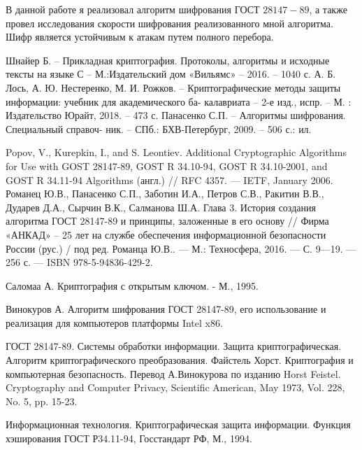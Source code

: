 \documentclass[oneside,final,14pt]{extreport}
\begin{document}
В данной работе я реализовал алгоритм шифрования ГОСТ $28147-89$, а также провел исследования скорости шифрования реализованного мной алгоритма. Шифр является устойчивым к атакам путем полного перебора.\\



\begin{thebibliography}{10}

Шнайер Б. – Прикладная криптография. Протоколы, алгоритмы
и исходные тексты на языке С – М.:Издательский дом «Вильямс» –
2016. – 1040 с.
А. Б. Лось, А. Ю. Нестеренко, М. И. Рожков. – Криптографические
методы защиты информации: учебник для академического ба-
калавриата – 2-е изд., испр. – М. : Издательство Юрайт, 2018. – 473
с.
Панасенко С.П. – Алгоритмы шифрования. Специальный справоч-
ник. – СПб.: БХВ-Петербург, 2009. – 506 с.: ил.


Popov, V., Kurepkin, I., and S. Leontiev. Additional Cryptographic Algorithms for Use with GOST 28147-89, GOST R 34.10-94, GOST R 34.10-2001, and GOST R 34.11-94 Algorithms (англ.) // RFC 4357. — IETF, January 2006.
Романец Ю.В., Панасенко С.П., Заботин И.А., Петров С.В., Ракитин В.В., Дударев Д.А., Сырчин В.К., Салманова Ш.А. Глава 3. История создания алгоритма ГОСТ 28147-89 и принципы, заложенные в его основу // Фирма «АНКАД» – 25 лет на службе обеспечения информационной безопасности России (рус.) / под ред. Романца Ю.В.. — М.: Техносфера, 2016. — С. 9—19. — 256 с. — ISBN 978-5-94836-429-2.


Саломаа А. Криптография с открытым ключом. - М., 1995.

 Винокуров А. Алгоритм шифрования ГОСТ 28147-89, его использование и реализация для компьютеров платформы Intel x86.

ГОСТ 28147-89. Системы обработки информации. Защита криптографическая. Алгоритм криптографического преобразования.
Файстель Хорст. Криптография и компьютерная безопасность. Перевод А.Винокурова по изданию Horst Feistel. Cryptography and Computer Privacy, Scientific American, May 1973, Vol. 228, No. 5, pp. 15-23. 


Информационная технология. Криптографическая защита информации. Функция хэширования ГОСТ Р34.11-94, Госстандарт РФ, М., 1994.


\end{thebibliography}
\end{document}
